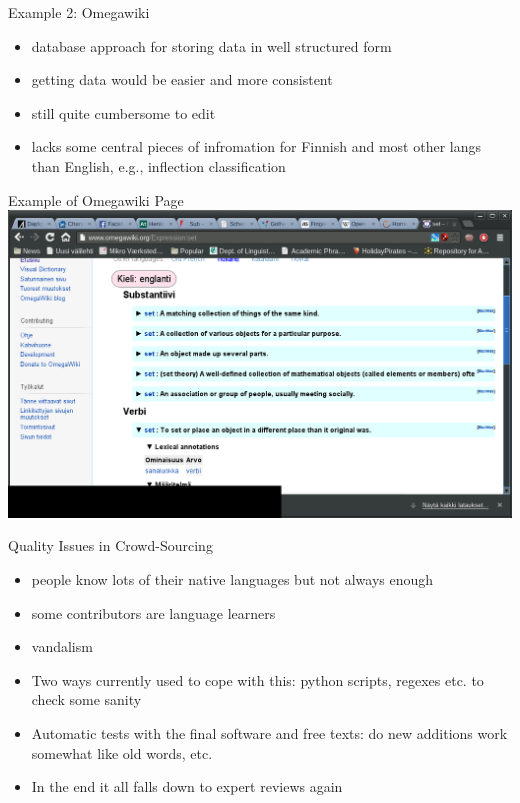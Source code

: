 \documentclass[t,12pt]{beamer}
\begin{document}
\begin{frame}{Example 2: Omegawiki}
    \begin{itemize}
        \item database approach for storing data in well structured form
        \item getting data would be easier and more consistent
        \item still quite cumbersome to edit
        \item lacks some central pieces of infromation for Finnish and most
            other langs than English, e.g., inflection classification
    \end{itemize}
\end{frame}

\begin{frame}[plain]{Example of Omegawiki Page}
    \includegraphics[keepaspectratio=true,width=1\paperwidth]{omegawiki}
\end{frame}

\begin{frame}{Quality Issues in Crowd-Sourcing}
    \begin{itemize}
        \item people know lots of their native languages but not always enough
        \item some contributors are language learners
        \item vandalism
        \item Two ways currently used to cope with this: python scripts, regexes
            etc. to check some sanity
        \item Automatic tests with the final software and free texts: do new
            additions work somewhat like old words, etc.
        \item In the end it all falls down to expert reviews again
    \end{itemize}
\end{frame}
\end{document}
